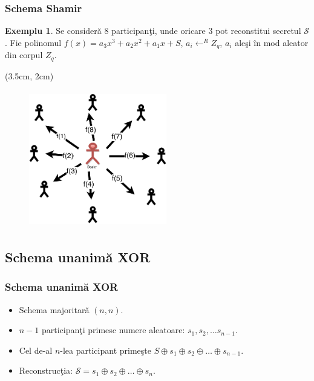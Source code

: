 \documentclass{beamer}
\theoremstyle{definition}
\newtheorem{my_example}[theorem]{Exemplu}
\begin{document}
\begin{frame}
    \frametitle{Schema Shamir}
     {
        \begin{my_example}
           Se consider\u{a} 8 participan\c{t}i, unde oricare $3$ pot reconstitui secretul $\mathcal{S}$.
           Fie polinomul $f(x) = a_3x ^ 3 + a_2x ^ 2 + a_1x + S$, $a_i \leftarrow^R Z_q$, $a_i$ ale\c{s}i \^{i}n mod aleator din corpul $Z_q$.
        \end{my_example}
    }
     {
     \begin{textblock*}{4cm}(3.5cm, 2cm)
        \begin{figure}
            \includegraphics[width=6cm,height=6cm,keepaspectratio]{img/shamir/shamir-split.png}
       \end{figure}
        \end{textblock*}
 
    }
\end{frame}

\subsection{Schema unanim\u{a} XOR}
\begin{frame}
    \frametitle{Schema unanim\u{a} XOR}
    \begin{itemize}
        \item Schema majoritar\u{a} $(n,n)$.
        \pause
        \item $n-1$ participan\c{t}i primesc numere aleatoare: $s_1, s_2, \dots s_{n-1}$.
        \pause
        \item Cel de-al $n$-lea participant prime\c{s}te $S \oplus s_1 \oplus s_2 \oplus \dots \oplus s_{n-1}$.
        \pause
        \item Reconstruc\c{t}ia: $\mathcal{S} = s_1 \oplus s_2 \oplus \dots \oplus s_n$.
    \end{itemize}
\end{frame}
\end{document}
